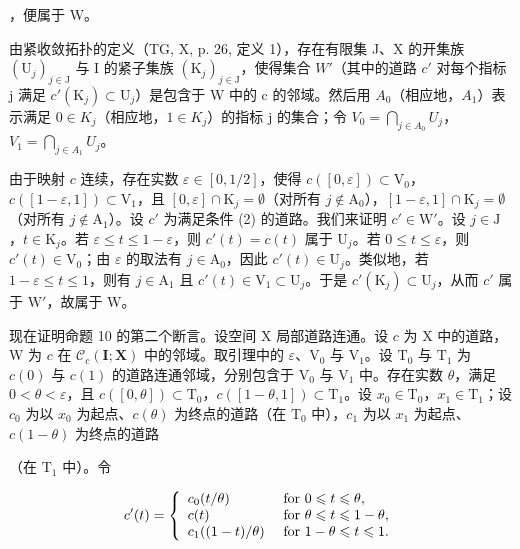 ，便属于 W。

由紧收敛拓扑的定义（TG, X, p. 26, 定义 1），存在有限集 J、X 的开集族 \((\mathrm{U}_{j})_{j\in\mathrm{J}}\) 与 I 的紧子集族 \((\mathrm{K}_{j})_{j\in\mathrm{J}}\)，使得集合 \(W'\)（其中的道路 \(c'\) 对每个指标 j 满足 \(c'(\mathrm{K}_{j})\subset\mathrm{U}_{j}\)）是包含于 W 中的 c 的邻域。然后用 \(A_{0}\)（相应地，\(A_{1}\)）表示满足 \(0\in K_{j}\)（相应地，\(1\in K_{j}\)）的指标 j 的集合；令 \(V_{0}=\bigcap_{j\in A_{0}}U_{j}\)，\(V_{1}=\bigcap_{j\in A_{1}}U_{j}\)。

由于映射 \(c\) 连续，存在实数 \(\varepsilon \in [0,1/2]\)，使得 \(c([0,\varepsilon]) \subset \mathrm{V}_0\)，\(c([1-\varepsilon,1]) \subset \mathrm{V}_1\)，且 \([0,\varepsilon] \cap \mathrm{K}_j = \emptyset\)（对所有 \(j \notin \mathrm{A}_0\)），\([1-\varepsilon,1] \cap \mathrm{K}_j = \emptyset\)（对所有 \(j \notin \mathrm{A}_1\)）。设 \(c'\) 为满足条件 (2) 的道路。我们来证明 \(c' \in \mathrm{W}'\)。设 \(j \in \mathrm{J}\)，\(t \in \mathrm{K}_j\)。若 \(\varepsilon \leqslant t \leqslant 1-\varepsilon\)，则 \(c'(t) = c(t)\) 属于 \(\mathrm{U}_j\)。若 \(0 \leqslant t \leqslant \varepsilon\)，则 \(c'(t) \in \mathrm{V}_0\)；由 \(\varepsilon\) 的取法有 \(j \in \mathrm{A}_0\)，因此 \(c'(t) \in \mathrm{U}_j\)。类似地，若 \(1-\varepsilon \leqslant t \leqslant 1\)，则有 \(j \in \mathrm{A}_1\) 且 \(c'(t) \in \mathrm{V}_1 \subset \mathrm{U}_j\)。于是 \(c'(\mathrm{K}_j) \subset \mathrm{U}_j\)，从而 \(c'\) 属于 \(\mathrm{W}'\)，故属于 W。

现在证明命题 10 的第二个断言。设空间 X 局部道路连通。设 \(c\) 为 X 中的道路，W 为 \(c\) 在 \(\mathcal{C}_c(\mathbf{I};\mathbf{X})\) 中的邻域。取引理中的 \(\varepsilon\)、\(\mathrm{V}_0\) 与 \(\mathrm{V}_1\)。设 \(\mathrm{T}_0\) 与 \(\mathrm{T}_1\) 为 \(c(0)\) 与 \(c(1)\) 的道路连通邻域，分别包含于 \(\mathrm{V}_0\) 与 \(\mathrm{V}_1\) 中。存在实数 \(\theta\)，满足 \(0 < \theta < \varepsilon\)，且 \(c([0,\theta]) \subset \mathrm{T}_0\)，\(c([1 - \theta,1]) \subset \mathrm{T}_1\)。设 \(x_0 \in \mathrm{T}_0\)，\(x_1 \in \mathrm{T}_1\)；设 \(c_0\) 为以 \(x_0\) 为起点、\(c(\theta)\) 为终点的道路（在 \(\mathrm{T}_0\) 中），\(c_1\) 为以 \(x_1\) 为起点、\(c(1 - \theta)\) 为终点的道路

（在 \(\mathrm{T}_1\) 中）。令

\[
c ^ {\prime} (t) = \left\{ \begin{array}{l l} c _ {0} (t / \theta) & \text { for } 0 \leqslant t \leqslant \theta , \\ c (t) & \text { for } \theta \leqslant t \leqslant 1 - \theta , \\ c _ {1} ((1 - t) / \theta) & \text { for } 1 - \theta \leqslant t \leqslant 1. \end{array} \right.
\]

